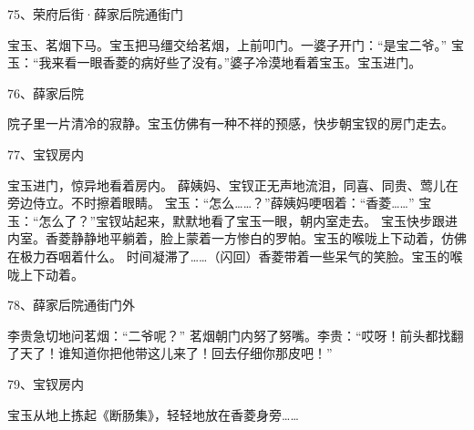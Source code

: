 75、荣府后街·薛家后院通街门\par
宝玉、茗烟下马。宝玉把马缰交给茗烟，上前叩门。一婆子开门：“是宝二爷。”
宝玉：“我来看一眼香菱的病好些了没有。”婆子冷漠地看着宝玉。宝玉进门。

76、薛家后院\par
院子里一片清冷的寂静。宝玉仿佛有一种不祥的预感，快步朝宝钗的房门走去。

77、宝钗房内\par
宝玉进门，惊异地看着房内。 薛姨妈、宝钗正无声地流泪，同喜、同贵、莺儿在旁边侍立。不时擦着眼睛。
宝玉：“怎么……？”薛姨妈哽咽着：“香菱……”
宝玉：“怎么了？”宝钗站起来，默默地看了宝玉一眼，朝内室走去。
宝玉快步跟进内室。香菱静静地平躺着，脸上蒙着一方惨白的罗帕。宝玉的喉咙上下动着，仿佛在极力吞咽着什么。
时间凝滞了……（闪回）香菱带着一些呆气的笑脸。宝玉的喉咙上下动着。

78、薛家后院通街门外\par
李贵急切地问茗烟：“二爷呢？”
茗烟朝门内努了努嘴。李贵：“哎呀！前头都找翻了天了！谁知道你把他带这儿来了！回去仔细你那皮吧！”

79、宝钗房内\par
宝玉从地上拣起《断肠集》，轻轻地放在香菱身旁……